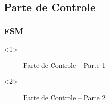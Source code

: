 \documentclass{beamer}
\begin{document}
    \subsection{Parte de Controle}
    \begin{frame}
        \frametitle{FSM}
        \begin{onlyenv}<1>
            \begin{figure}[h]
                \centering
                \caption{\label{img:fsm-1} Parte de Controle – Parte 1}
            \end{figure}
        \end{onlyenv}

        \begin{onlyenv}<2>
          \begin{figure}[h]
            \centering
            \caption{\label{img:fsm-2} Parte de Controle – Parte 2}
          \end{figure}
        \end{onlyenv}
    \end{frame}
\end{document}
